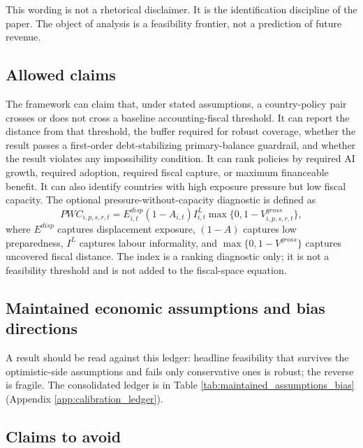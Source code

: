 \documentclass[11pt,a4paper]{article}
\begin{document}
This wording is not a rhetorical disclaimer. It is the identification discipline of the paper. The object of analysis is a feasibility frontier, not a prediction of future revenue.

\subsection{Allowed claims}

The framework can claim that, under stated assumptions, a country-policy pair crosses or does not cross a baseline accounting-fiscal threshold. It can report the distance from that threshold, the buffer required for robust coverage, whether the result passes a first-order debt-stabilizing primary-balance guardrail, and whether the result violates any impossibility condition. It can rank policies by required AI growth, required adoption, required fiscal capture, or maximum financeable benefit. It can also identify countries with high exposure pressure but low fiscal capacity. The optional pressure-without-capacity diagnostic is defined as
\begin{equation}\label{eq:pwc_index_v22}
    PWC_{i,p,s,r,t}=E^{disp}_{i,t}(1-A_{i,t})I^L_{i,t}\max\{0,1-V^{gross}_{i,p,s,r,t}\},
\end{equation}
where $E^{disp}$ captures displacement exposure, $(1-A)$ captures low preparedness, $I^L$ captures labour informality, and $\max\{0,1-V^{gross}\}$ captures uncovered fiscal distance. The index is a ranking diagnostic only; it is not a feasibility threshold and is not added to the fiscal-space equation.

\subsection{Maintained economic assumptions and bias directions}

A result should be read against this ledger: headline feasibility that survives the optimistic-side assumptions and fails only conservative ones is robust; the reverse is fragile. The consolidated ledger is in Table \ref{tab:maintained_assumptions_bias} (Appendix \ref{app:calibration_ledger}).

\subsection{Claims to avoid}
\end{document}
